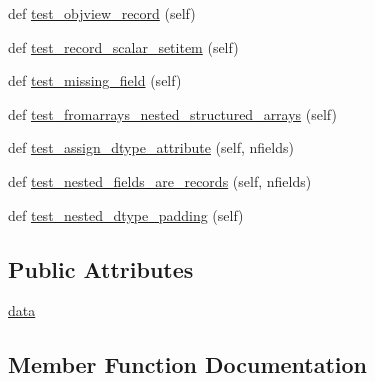 \begin{DoxyCompactItemize}
\item 
def \hyperlink{classnumpy_1_1core_1_1tests_1_1test__records_1_1TestRecord_a9b76731f88d970ecc3df7465aab35f6f}{test\+\_\+objview\+\_\+record} (self)
\item 
def \hyperlink{classnumpy_1_1core_1_1tests_1_1test__records_1_1TestRecord_a3fb6c39e45f8db59760999f237dc3b63}{test\+\_\+record\+\_\+scalar\+\_\+setitem} (self)
\item 
def \hyperlink{classnumpy_1_1core_1_1tests_1_1test__records_1_1TestRecord_aedfc58e10d73a4269239b436c4296237}{test\+\_\+missing\+\_\+field} (self)
\item 
def \hyperlink{classnumpy_1_1core_1_1tests_1_1test__records_1_1TestRecord_a48529d6d54d65e8c2b15775fbaa02ff2}{test\+\_\+fromarrays\+\_\+nested\+\_\+structured\+\_\+arrays} (self)
\item 
def \hyperlink{classnumpy_1_1core_1_1tests_1_1test__records_1_1TestRecord_aea7c67fc147f044f7bc62b1b2723e253}{test\+\_\+assign\+\_\+dtype\+\_\+attribute} (self, nfields)
\item 
def \hyperlink{classnumpy_1_1core_1_1tests_1_1test__records_1_1TestRecord_a77ab577f8445fffd08a7adb438ea03a0}{test\+\_\+nested\+\_\+fields\+\_\+are\+\_\+records} (self, nfields)
\item 
def \hyperlink{classnumpy_1_1core_1_1tests_1_1test__records_1_1TestRecord_a94fab095fad9e6cfa6651c8353bf586e}{test\+\_\+nested\+\_\+dtype\+\_\+padding} (self)
\end{DoxyCompactItemize}
\subsection*{Public Attributes}
\begin{DoxyCompactItemize}
\item 
\hyperlink{classnumpy_1_1core_1_1tests_1_1test__records_1_1TestRecord_a7135cb506b62a2feed664bd248e03b75}{data}
\end{DoxyCompactItemize}


\subsection{Member Function Documentation}
\mbox{\label{classnumpy_1_1core_1_1tests_1_1test__records_1_1TestRecord_a8ccf45bf92a3131b50881440ccf4ece3}} 
